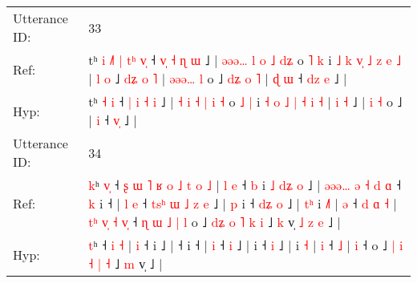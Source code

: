 \documentclass[10pt]{article}
\DeclareRobustCommand{\hl}[1]{{\textcolor{red}{#1}}}
\begin{document}
\begin{longtable}{ll}
 \\
\midrule
Utterance ID: & 33 \\
Ref: & tʰ\hl{ }\hl{i}\hl{ }\hl{˩}\hl{˥}\hl{ }\hl{|} \hl{t}\hl{ʰ} \hl{v}\hl{̩} ˧ \hl{v}\hl{̩} \hl{˧} \hl{ɳ} \hl{ɯ} ˩ | \hl{ə}\hl{ə}\hl{ə}\hl{…} \hl{l} \hl{o} \hl{˩} \hl{d}\hl{ʑ} o \hl{˥} \hl{k} i \hl{˩} \hl{k} \hl{v}\hl{̩} \hl{˩} \hl{z} \hl{e} \hl{˩} | \hl{l} \hl{o} ˩\hl{ }\hl{d}\hl{ʑ}\hl{ }\hl{o}\hl{ }\hl{˥} | \hl{ə}\hl{ə}\hl{ə}\hl{…} \hl{l} o ˩\hl{ }\hl{d}\hl{ʑ}\hl{ }\hl{o}\hl{ }\hl{˥} |\hl{ }\hl{ɖ} \hl{ɯ} ˧ \hl{d}\hl{z}\hl{ }\hl{e} ˩ |
 \\
Hyp: & tʰ\hl{}\hl{}\hl{}\hl{}\hl{}\hl{}\hl{} \hl{}\hl{˧} \hl{}\hl{i} ˧ \hl{}\hl{|} \hl{i} \hl{˧} \hl{i} ˩ | \hl{}\hl{˧}\hl{ }\hl{i} \hl{˧} \hl{|} \hl{i} \hl{}\hl{˧} o \hl{˩} \hl{|} i \hl{˧} \hl{o} \hl{}\hl{˩} \hl{|} \hl{˧} \hl{i} \hl{˧} | \hl{i} \hl{˧} ˩\hl{}\hl{}\hl{}\hl{}\hl{}\hl{}\hl{} | \hl{}\hl{}\hl{}\hl{i} \hl{˧} o ˩\hl{}\hl{}\hl{}\hl{}\hl{}\hl{}\hl{} |\hl{}\hl{} \hl{i} ˧ \hl{}\hl{}\hl{v}\hl{̩} ˩ |
 \\
\midrule
Utterance ID: & 34 \\
Ref: & \hl{k}ʰ\hl{ }\hl{v}\hl{̩} ˧\hl{ }\hl{ʂ}\hl{ }\hl{ɯ}\hl{ }\hl{˥}\hl{ }\hl{ʁ}\hl{ }\hl{o}\hl{ }\hl{˩}\hl{ }\hl{t} \hl{o} \hl{˩} |\hl{ }\hl{l} \hl{e} ˧\hl{ }\hl{b} i\hl{ }\hl{˩}\hl{ }\hl{d}\hl{ʑ}\hl{ }\hl{o} ˩ |\hl{ }\hl{ə}\hl{ə}\hl{ə}\hl{…}\hl{ }\hl{ə}\hl{ }\hl{˧}\hl{ }\hl{d}\hl{ }\hl{ɑ} ˧\hl{ }\hl{k} i ˧ |\hl{ }\hl{l} \hl{e} ˧\hl{ }\hl{t}\hl{s}\hl{ʰ}\hl{ }\hl{ɯ}\hl{ }\hl{˩}\hl{ }\hl{z} \hl{e} ˩ |\hl{ }\hl{p} i ˧\hl{ }\hl{d}\hl{ʑ} \hl{o} ˩ |\hl{ }\hl{t}\hl{ʰ} i \hl{˩}\hl{˥} | \hl{ə} ˧\hl{ }\hl{d}\hl{ }\hl{ɑ} \hl{˧} |\hl{ }\hl{t}\hl{ʰ}\hl{ }\hl{v}\hl{̩}\hl{ }\hl{˧} \hl{v}\hl{̩} ˧\hl{ }\hl{ɳ}\hl{ }\hl{ɯ}\hl{ }\hl{˩}\hl{ }\hl{|}\hl{ }\hl{l} o ˩ \hl{d}\hl{ʑ} \hl{o} \hl{˥} \hl{k} \hl{i} ˩ \hl{k} v̩\hl{ }\hl{˩}\hl{ }\hl{z}\hl{ }\hl{e} ˩ |
 \\
Hyp: & \hl{t}ʰ\hl{}\hl{}\hl{} ˧\hl{}\hl{}\hl{}\hl{}\hl{}\hl{}\hl{}\hl{}\hl{}\hl{}\hl{}\hl{}\hl{}\hl{} \hl{i} \hl{˧} |\hl{}\hl{} \hl{i} ˧\hl{}\hl{} i\hl{}\hl{}\hl{}\hl{}\hl{}\hl{}\hl{} ˩ |\hl{}\hl{}\hl{}\hl{}\hl{}\hl{}\hl{}\hl{}\hl{}\hl{}\hl{}\hl{}\hl{} ˧\hl{}\hl{} i ˧ |\hl{}\hl{} \hl{i} ˧\hl{}\hl{}\hl{}\hl{}\hl{}\hl{}\hl{}\hl{}\hl{}\hl{} \hl{i} ˩ |\hl{}\hl{} i ˧\hl{}\hl{}\hl{} \hl{i} ˩ |\hl{}\hl{}\hl{} i \hl{}\hl{˧} | \hl{i} ˧\hl{}\hl{}\hl{}\hl{} \hl{˩} |\hl{}\hl{}\hl{}\hl{}\hl{}\hl{}\hl{}\hl{} \hl{}\hl{i} ˧\hl{}\hl{}\hl{}\hl{}\hl{}\hl{}\hl{}\hl{}\hl{}\hl{} o ˩ \hl{}\hl{|} \hl{i} \hl{˧} \hl{|} \hl{˧} ˩ \hl{m} v̩\hl{}\hl{}\hl{}\hl{}\hl{}\hl{} ˩ |
 \\

\end{longtable}
\end{document}
